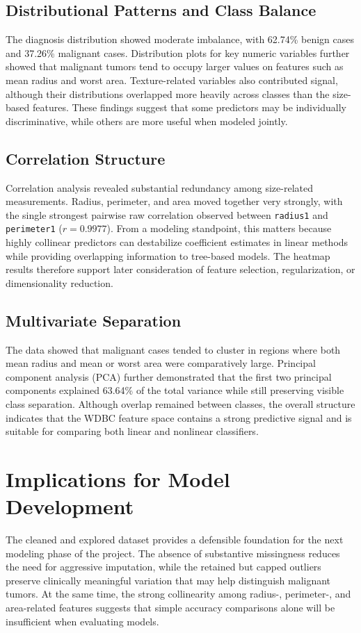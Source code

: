 \documentclass[conference]{IEEEtran}
\begin{document}
\subsection{Distributional Patterns and Class Balance}
The diagnosis distribution showed moderate imbalance, with 62.74\% benign cases and 37.26\% malignant cases. Distribution plots for key numeric variables further showed that malignant tumors tend to occupy larger values on features such as mean radius and worst area. Texture-related variables also contributed signal, although their distributions overlapped more heavily across classes than the size-based features. These findings suggest that some predictors may be individually discriminative, while others are more useful when modeled jointly.

\subsection{Correlation Structure}
Correlation analysis revealed substantial redundancy among size-related measurements. Radius, perimeter, and area moved together very strongly, with the single strongest pairwise raw correlation observed between \texttt{radius1} and \texttt{perimeter1} ($r = 0.9977$). From a modeling standpoint, this matters because highly collinear predictors can destabilize coefficient estimates in linear methods while providing overlapping information to tree-based models. The heatmap results therefore support later consideration of feature selection, regularization, or dimensionality reduction.

\subsection{Multivariate Separation}
The data showed that malignant cases tended to cluster in regions where both mean radius and mean or worst area were comparatively large. Principal component analysis (PCA) further demonstrated that the first two principal components explained 63.64\% of the total variance while still preserving visible class separation. Although overlap remained between classes, the overall structure indicates that the WDBC feature space contains a strong predictive signal and is suitable for comparing both linear and nonlinear classifiers.

\section{Implications for Model Development}
The cleaned and explored dataset provides a defensible foundation for the next modeling phase of the project. The absence of substantive missingness reduces the need for aggressive imputation, while the retained but capped outliers preserve clinically meaningful variation that may help distinguish malignant tumors. At the same time, the strong collinearity among radius-, perimeter-, and area-related features suggests that simple accuracy comparisons alone will be insufficient when evaluating models.
\end{document}
